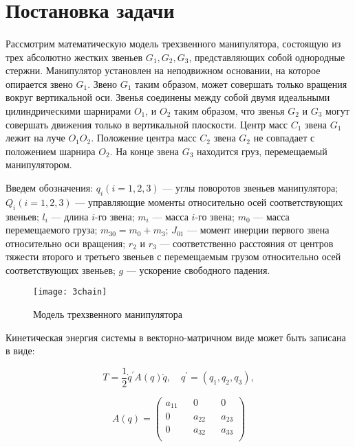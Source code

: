 \section{Постановка задачи} \label{p31}
\paragraph{}
 Рассмотрим математическую модель трехзвенного манипулятора, состоящую из трех абсолютно жестких звеньев $G_1, G_2, G_3$, представляющих собой однородные стержни. Манипулятор установлен на неподвижном основании, на которое опирается звено $G_1$. Звено $G_1$ таким образом, может совершать только вращения вокруг вертикальной оси. Звенья соединены между собой двумя идеальными цилиндрическими шарнирами $O_1$, и $O_2$ таким образом, что звенья $G_2$ и $G_3$ могут совершать движения только в вертикальной плоскости. Центр масс $C_1$ звена $G_1$ лежит на луче  $O_1 O_2$. Положение центра масс $C_2$ звена $G_2$ не совпадает с положением шарнира $O_2$. На конце звена $G_3$ находится груз, перемещаемый манипулятором.
 
 Введем обозначения: $q_i (i=1, 2, 3)$ --- углы поворотов звеньев манипулятора; $Q_i (i = 1, 2, 3)$ ---  управляющие моменты относительно осей соответствующих звеньев; $l_i$  ---  длина   $i$-го звена;   $m_i$ --- масса  $i$-го звена;    $m_0$ ---  масса перемещаемого груза;  $m_{30} = m_0 + m_3$; $J_{01}$  ---  момент инерции первого звена относительно оси вращения; $r_2$ и $r_3$ --- соответственно расстояния от центров тяжести второго и третьего звеньев с перемещаемым грузом относительно осей соответствующих звеньев; $g$ --- ускорение свободного падения.
 
 \begin{figure}[H]
 	\centering
 	\texttt{[image: 3chain]}
 	\caption{Модель трехзвенного манипулятора}
 	\label{fig:manip1}
 \end{figure}
 
 Кинетическая энергия системы в векторно-матричном виде может быть записана в виде:
 
  \begin{equation*}
  T = \frac12 \dot q^{'} A(q) \dot q, \quad q^{'} = (q_1, q_2, q_3),
  \end{equation*}
  
  \begin{equation*}
  A(q) =
  \begin{pmatrix}
  a_{11} && 0 && 0  \\
  0  && a_{22} && a_{23} \\
  0 && a_{32} &&  a_{33}\\
  \end{pmatrix}
  \end{equation*}
  
